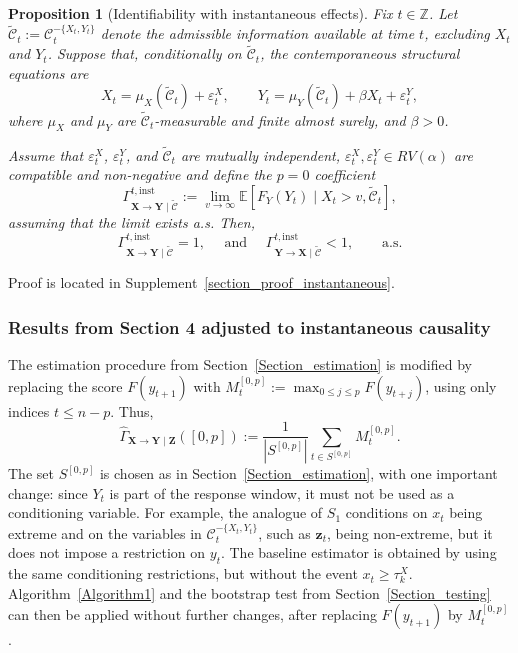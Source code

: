 \documentclass[a4paper,11pt]{article}
\newtheorem{proposition}{Proposition}
\begin{document}
\begin{proposition}[Identifiability with instantaneous effects]
\label{theorem_instantaneous}
Fix \(t\in\mathbb Z\). Let \(
\tilde{\mathcal C}_t:=\mathcal C_t^{-\{X_t,Y_t\}}
\) denote the admissible information available at time \(t\), excluding \(X_t\) and \(Y_t\).
Suppose that, conditionally on \(\tilde{\mathcal C}_t\), the contemporaneous structural equations are
\[
X_t=\mu_X(\tilde{\mathcal C}_t)+\varepsilon_t^X,
\qquad
Y_t=\mu_Y(\tilde{\mathcal C}_t)+\beta X_t+\varepsilon_t^Y,
\]
where \(\mu_X\) and \(\mu_Y\) are \(\tilde{\mathcal C}_t\)-measurable and finite almost surely, and $\beta>0$. 

Assume that \(\varepsilon_t^X\), \(\varepsilon_t^Y\), and \(\tilde{\mathcal C}_t\) are mutually independent,  \(\varepsilon_t^X, \varepsilon_t^Y\in RV(\alpha)\) are compatible and non-negative and define the $p=0$ coefficient 
\[
\Gamma^{t,\mathrm{inst}}_{\mathbf X\to\mathbf Y\mid\tilde{\mathcal C}}
:=
\lim_{v\to\infty}
\mathbb E\!\left[
F_Y(Y_t)\mid X_t>v,\tilde{\mathcal C}_t
\right],
\]
assuming that the limit exists a.s. Then,
\[
\Gamma^{t,\mathrm{inst}}_{\mathbf X\to\mathbf Y\mid\tilde{\mathcal C}}=1, \quad  \text{ and } \quad \Gamma^{t,\mathrm{inst}}_{\mathbf Y\to\mathbf X\mid\tilde{\mathcal C}}<1,
\quad
\quad\text{a.s.}
\]
\end{proposition}
Proof is located in Supplement~\ref{section_proof_instantaneous}. 


\subsubsection{Results from Section 4 adjusted to instantaneous causality}

The estimation procedure from Section~\ref{Section_estimation} is modified by replacing the score \(F(y_{t+1})\) with \(M_t^{[0,p]}:=\max_{0\le j\le p}F(y_{t+j})\), using only indices \(t\le n-p\). Thus,
\[
\widehat\Gamma_{\mathbf X\to\mathbf Y\mid\mathbf Z}([0,p])
:=
\frac{1}{|S^{[0,p]}|}
\sum_{t\in S^{[0,p]}} M_t^{[0,p]} .
\]
The set \(S^{[0,p]}\) is chosen as in Section~\ref{Section_estimation}, with one important change: since \(Y_t\) is part of the response window, it must not be used as a conditioning variable. For example, the analogue of \(S_1\) conditions on \(x_t\) being extreme and on the variables in \(\mathcal C_t^{-\{X_t,Y_t\}}\), such as \(\mathbf z_t\), being non-extreme, but it does not impose a restriction on \(y_t\). The baseline estimator is obtained by using the same conditioning restrictions, but without the event \(x_t\ge \tau_k^X\).
Algorithm~\ref{Algorithm1} and the bootstrap test from Section~\ref{Section_testing} can then be applied without further changes, after replacing \(F(y_{t+1})\) by \(M_t^{[0,p]}\). 
\end{document}
